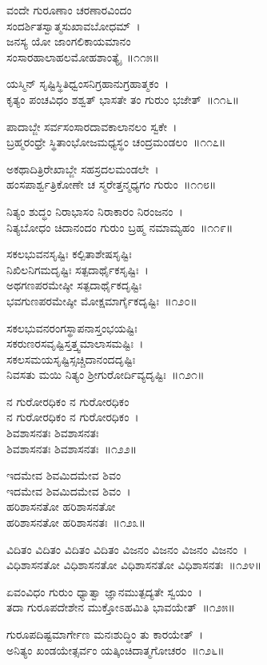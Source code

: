 ವಂದೇ ಗುರೂಣಾಂ ಚರಣಾರವಿಂದಂ\\ ಸಂದರ್ಶಿತಸ್ವಾತ್ಮಸುಖಾವಬೋಧಮ್~।\\
ಜನಸ್ಯ ಯೋ ಜಾಂಗಲಿಕಾಯಮಾನಂ \\ಸಂಸಾರಹಾಲಾಹಲಮೋಹಶಾಂತ್ಯೈ~॥೧೧೫॥

ಯಸ್ಮಿನ್ ಸೃಷ್ಟಿಸ್ಥಿತಿಧ್ವಂಸನಿಗ್ರಹಾನುಗ್ರಹಾತ್ಮಕಂ~।\\
ಕೃತ್ಯಂ ಪಂಚವಿಧಂ ಶಶ್ವತ್ ಭಾಸತೇ ತಂ ಗುರುಂ ಭಜೇತ್~॥೧೧೬॥

ಪಾದಾಬ್ಜೇ ಸರ್ವಸಂಸಾರದಾವಕಾಲಾನಲಂ ಸ್ವಕೇ~।\\
ಬ್ರಹ್ಮರಂಧ್ರೇ ಸ್ಥಿತಾಂಭೋಜಮಧ್ಯಸ್ಥಂ ಚಂದ್ರಮಂಡಲಂ~॥೧೧೭॥

ಅಕಥಾದಿತ್ರಿರೇಖಾಬ್ಜೇ ಸಹಸ್ರದಲಮಂಡಲೇ~।\\
ಹಂಸಪಾರ್ಶ್ವತ್ರಿಕೋಣೇ ಚ ಸ್ಮರೇತ್ತನ್ಮಧ್ಯಗಂ ಗುರುಂ~॥೧೧೮॥

ನಿತ್ಯಂ ಶುದ್ಧಂ ನಿರಾಭಾಸಂ ನಿರಾಕಾರಂ ನಿರಂಜನಂ~।\\
ನಿತ್ಯಬೋಧಂ ಚಿದಾನಂದಂ ಗುರುಂ ಬ್ರಹ್ಮ ನಮಾಮ್ಯಹಂ~॥೧೧೯॥

ಸಕಲಭುವನಸೃಷ್ಟಿಃ ಕಲ್ಪಿತಾಶೇಷಸೃಷ್ಟಿಃ\\
ನಿಖಿಲನಿಗಮದೃಷ್ಟಿಃ ಸತ್ಪದಾರ್ಥೈಕಸೃಷ್ಟಿಃ~।\\
ಅಥಗಣಪರಮೇಷ್ಠೀ ಸತ್ಪದಾರ್ಥೈಕದೃಷ್ಟಿಃ\\
ಭವಗುಣಪರಮೇಷ್ಠೀ ಮೋಕ್ಷಮಾರ್ಗೈಕದೃಷ್ಟಿಃ~॥೧೨೦॥

ಸಕಲಭುವನರಂಗಸ್ಥಾಪನಾಸ್ತಂಭಯಷ್ಟಿಃ\\
ಸಕರುಣರಸವೃಷ್ಟಿಸ್ತತ್ತ್ವಮಾಲಾಸಮಷ್ಟಿಃ~।\\
ಸಕಲಸಮಯಸೃಷ್ಟಿಸ್ಸಚ್ಚಿದಾನಂದದೃಷ್ಟಿಃ\\
ನಿವಸತು ಮಯಿ ನಿತ್ಯಂ ಶ್ರೀಗುರೋರ್ದಿವ್ಯದೃಷ್ಟಿಃ~॥೧೨೧॥

ನ ಗುರೋರಧಿಕಂ ನ ಗುರೋರಧಿಕಂ\\ ನ ಗುರೋರಧಿಕಂ ನ ಗುರೋರಧಿಕಂ~।\\
ಶಿವಶಾಸನತಃ ಶಿವಶಾಸನತಃ \\ಶಿವಶಾಸನತಃ ಶಿವಶಾಸನತಃ~॥೧೨೨॥

ಇದಮೇವ ಶಿವಮಿದಮೇವ ಶಿವಂ\\ ಇದಮೇವ ಶಿವಮಿದಮೇವ ಶಿವಂ~।\\
ಹರಿಶಾಸನತೋ ಹರಿಶಾಸನತೋ\\ ಹರಿಶಾಸನತೋ ಹರಿಶಾಸನತಃ~॥೧೨೩॥

ವಿದಿತಂ ವಿದಿತಂ ವಿದಿತಂ ವಿದಿತಂ ವಿಜನಂ ವಿಜನಂ ವಿಜನಂ ವಿಜನಂ~।\\
ವಿಧಿಶಾಸನತೋ ವಿಧಿಶಾಸನತೋ ವಿಧಿಶಾಸನತೋ ವಿಧಿಶಾಸನತಃ~॥೧೨೪॥

ಏವಂವಿಧಂ ಗುರುಂ ಧ್ಯಾತ್ವಾ ಜ್ಞಾನಮುತ್ಪದ್ಯತೇ ಸ್ವಯಂ~।\\
ತದಾ ಗುರೂಪದೇಶೇನ ಮುಕ್ತೋಽಹಮಿತಿ ಭಾವಯೇತ್~॥೧೨೫॥

ಗುರೂಪದಿಷ್ಟಮಾರ್ಗೇಣ ಮನಃಶುದ್ಧಿಂ ತು ಕಾರಯೇತ್~।\\
ಅನಿತ್ಯಂ ಖಂಡಯೇತ್ಸರ್ವಂ ಯತ್ಕಿಂಚಿದಾತ್ಮಗೋಚರಂ~॥೧೨೬॥

